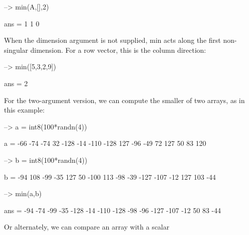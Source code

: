 \begin{DoxyVerbInclude}
--> min(A,[],2)

ans = 
 1 
 1 
 0 
\end{DoxyVerbInclude}


When the dimension argument is not supplied, {\ttfamily min} acts along the first non-\/singular dimension. For a row vector, this is the column direction\-:


\begin{DoxyVerbInclude}
--> min([5,3,2,9])

ans = 
 2 
\end{DoxyVerbInclude}


For the two-\/argument version, we can compute the smaller of two arrays, as in this example\-:


\begin{DoxyVerbInclude}
--> a = int8(100*randn(4))

a = 
  -66  -74  -74   32 
 -128  -14 -110 -128 
  127  -96  -49   72 
  127   50   83  120 

--> b = int8(100*randn(4))

b = 
  -94  108  -99  -35 
  127   50 -100  113 
  -98  -39 -127 -107 
  -12  127  103  -44 

--> min(a,b)

ans = 
  -94  -74  -99  -35 
 -128  -14 -110 -128 
  -98  -96 -127 -107 
  -12   50   83  -44 
\end{DoxyVerbInclude}


Or alternately, we can compare an array with a scalar


